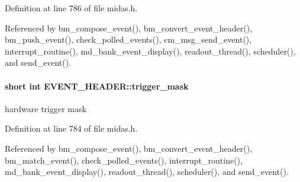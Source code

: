 Definition at line 786 of file midas.h.

Referenced by bm\_\-compose\_\-event(), bm\_\-convert\_\-event\_\-header(), bm\_\-push\_\-event(), check\_\-polled\_\-events(), cm\_\-msg\_\-send\_\-event(), interrupt\_\-routine(), md\_\-bank\_\-event\_\-display(), readout\_\-thread(), scheduler(), and send\_\-event().
\paragraph[{trigger\_\-mask}]{\setlength{\rightskip}{0pt plus 5cm}short int {\bf EVENT\_\-HEADER::trigger\_\-mask}}\hfill\label{structEVENT__HEADER_a9b4b94f41521f5c188655b7bb0f1ec1b}
hardware trigger mask 

Definition at line 784 of file midas.h.

Referenced by bm\_\-compose\_\-event(), bm\_\-convert\_\-event\_\-header(), bm\_\-match\_\-event(), check\_\-polled\_\-events(), interrupt\_\-routine(), md\_\-bank\_\-event\_\-display(), readout\_\-thread(), scheduler(), and send\_\-event().